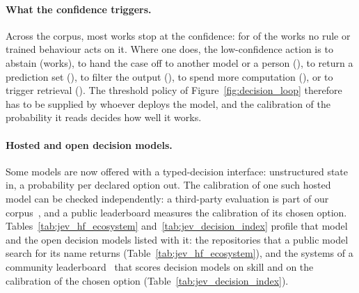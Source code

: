 \paragraph{What the confidence triggers.} Across the corpus, most works stop at the confidence: for
\nActNoAction of the \nWorks works no rule or trained behaviour acts on it. Where one does, the
low-confidence action is to abstain (\nActAbstain works), to hand the case off to another model or a
person (\nActHandOff), to return a prediction set (\nActSet), to filter the output (\nActFilter), to
spend more computation (\nActAdapt), or to trigger retrieval (\nActRetrieve). The threshold policy of
Figure~\ref{fig:decision_loop} therefore has to be supplied by whoever deploys the model, and the
calibration of the probability it reads decides how well it works.

\paragraph{Hosted and open decision models.} Some models are now offered with a typed-decision
interface:
unstructured state in, a probability per declared option out. The calibration of one such hosted
model can be checked independently: a third-party evaluation is part of our corpus~\citep{li2026jev},
and a public leaderboard measures the calibration of its chosen option. Tables~\ref{tab:jev_hf_ecosystem} and~\ref{tab:jev_decision_index}
profile that model and the open decision models listed with it: the
\nHF repositories that a public model search for its name returns (Table~\ref{tab:jev_hf_ecosystem}),
and the \nDISystems systems of a community leaderboard~\citep{multimodalart2026jevdi} that scores decision models on skill and on the
calibration of the chosen option (Table~\ref{tab:jev_decision_index}).

